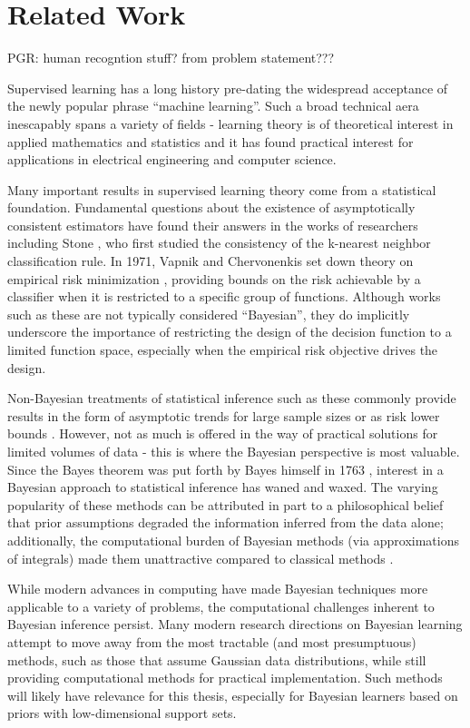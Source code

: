 \documentclass[12pt]{article}
\begin{document}
\newpage
\section{Related Work} \label{sec:related}

PGR: human recogntion stuff? from problem statement???

Supervised learning has a long history pre-dating the widespread acceptance of the newly popular phrase ``machine learning''. Such a broad technical aera inescapably spans a variety of fields - learning theory is of theoretical interest in applied mathematics and statistics and it has found practical interest for applications in electrical engineering and computer science. 

Many important results in supervised learning theory come from a statistical foundation. Fundamental questions about the existence of asymptotically consistent estimators have found their answers in the works of researchers including Stone \cite{stone}, who first studied the consistency of the k-nearest neighbor classification rule. In 1971, Vapnik and Chervonenkis set down theory on empirical risk minimization \cite{vapnik}, providing bounds on the risk achievable by a classifier when it is restricted to a specific group of functions. Although works such as these are not typically considered ``Bayesian'', they do implicitly underscore the importance of restricting the design of the decision function to a limited function space, especially when the empirical risk objective drives the design.

Non-Bayesian treatments of statistical inference such as these commonly provide results in the form of asymptotic trends for large sample sizes or as risk lower bounds \cite{devroye}. However, not as much is offered in the way of practical solutions for limited volumes of data - this is where the Bayesian perspective is most valuable. Since the Bayes theorem was put forth by Bayes himself in 1763 \cite{bayes}, interest in a Bayesian approach to statistical inference has waned and waxed. The varying popularity of these methods can be attributed in part to a philosophical belief that prior assumptions degraded the information inferred from the data alone; additionally, the computational burden of Bayesian methods (via approximations of integrals) made them unattractive compared to classical methods \cite{box}.

While modern advances in computing have made Bayesian techniques more applicable to a variety of problems, the computational challenges inherent to Bayesian inference persist. Many modern research directions on Bayesian learning attempt to move away from the most tractable (and most presumptuous) methods, such as those that assume Gaussian data distributions, while still providing computational methods for practical implementation. Such methods will likely have relevance for this thesis, especially for Bayesian learners based on priors with low-dimensional support sets.
\end{document}
